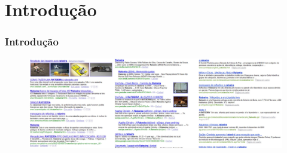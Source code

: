 \section{Introdu\c{c}\~ao}
	\begin{frame}
	\frametitle{\huge Introdu\c{c}\~ao}
		\begin{figure}[htb]
			\begin{center}				
				\includegraphics[scale=0.095]{./figuras/ratoeira-g.jpg}				
			\end{center}			            
		\end{figure}
	\end{frame}
